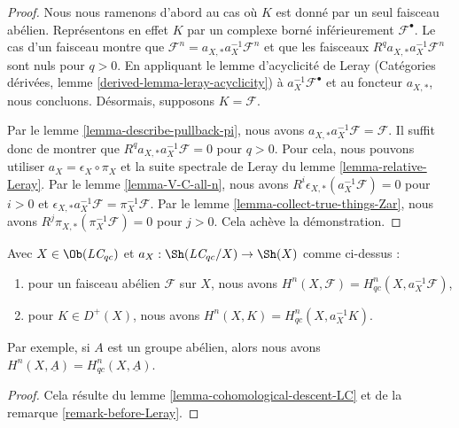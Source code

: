 \begin{proof}
Nous nous ramenons d'abord au cas où $K$ est donné par un seul faisceau
abélien. Représentons en effet $K$ par un complexe borné inférieurement
$\mathcal{F}^\bullet$. Le cas d'un faisceau montre que
$\mathcal{F}^n = a_{X, *} a_X^{-1} \mathcal{F}^n$
et que les faisceaux $R^qa_{X, *}a_X^{-1}\mathcal{F}^n$ sont nuls pour
$q > 0$. En appliquant le lemme d'acyclicité de Leray
(Catégories dérivées, lemme \ref{derived-lemma-leray-acyclicity}) à
$a_X^{-1}\mathcal{F}^\bullet$ et au foncteur $a_{X, *}$, nous concluons.
Désormais, supposons $K = \mathcal{F}$.

\medskip\noindent
Par le lemme \ref{lemma-describe-pullback-pi}, nous avons
$a_{X, *}a_X^{-1}\mathcal{F} = \mathcal{F}$. Il suffit donc de montrer que
$R^qa_{X, *}a_X^{-1}\mathcal{F} = 0$ pour $q > 0$.
Pour cela, nous pouvons utiliser $a_X = \epsilon_X \circ \pi_X$ et la suite
spectrale de Leray du lemme \ref{lemma-relative-Leray}.
Par le lemme \ref{lemma-V-C-all-n}, nous avons
$R^i\epsilon_{X, *}(a_X^{-1}\mathcal{F}) = 0$ pour $i > 0$ et
$\epsilon_{X, *}a_X^{-1}\mathcal{F} = \pi_X^{-1}\mathcal{F}$.
Par le lemme \ref{lemma-collect-true-things-Zar}, nous avons
$R^j\pi_{X, *}(\pi_X^{-1}\mathcal{F}) = 0$ pour $j > 0$.
Cela achève la démonstration.
\end{proof}

\begin{lemma}
\label{lemma-compare-cohomology-LC}
Avec $X \in \Ob(\textit{LC}_{qc})$ et
$a_X : \Sh(\textit{LC}_{qc}/X) \to \Sh(X)$ comme ci-dessus :
\begin{enumerate}
\item pour un faisceau abélien $\mathcal{F}$ sur $X$, nous avons
$H^n(X, \mathcal{F}) = H^n_{qc}(X, a_X^{-1}\mathcal{F})$,
\item pour $K \in D^+(X)$, nous avons
$H^n(X, K) = H^n_{qc}(X, a_X^{-1}K)$.
\end{enumerate}
Par exemple, si $A$ est un groupe abélien, alors nous avons
$H^n(X, \underline{A}) = H^n_{qc}(X, \underline{A})$.
\end{lemma}

\begin{proof}
Cela résulte du lemme \ref{lemma-cohomological-descent-LC} et de la
remarque \ref{remark-before-Leray}.
\end{proof}











